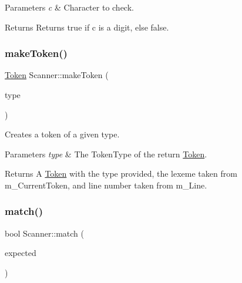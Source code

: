 \begin{DoxyParams}{Parameters}
{\em c} & Character to check. \\
\hline
\end{DoxyParams}
\begin{DoxyReturn}{Returns}
Returns true if c is a digit, else false. 
\end{DoxyReturn}
\mbox{\label{class_scanner_a67c546b078ac1e6780aa5ded2bfc4754}} 
\subsubsection{\texorpdfstring{make\+Token()}{makeToken()}}
{\footnotesize\ttfamily \hyperlink{struct_token}{Token} Scanner\+::make\+Token (\begin{DoxyParamCaption}\item[{\hyperlink{_scanner_8h_aa520fbf142ba1e7e659590c07da31921}{Token\+Type}}]{type }\end{DoxyParamCaption})\hspace{0.3cm}{\ttfamily [private]}}



Creates a token of a given type. 


\begin{DoxyParams}{Parameters}
{\em type} & The Token\+Type of the return \hyperlink{struct_token}{Token}. \\
\hline
\end{DoxyParams}
\begin{DoxyReturn}{Returns}
A \hyperlink{struct_token}{Token} with the type provided, the lexeme taken from m\+\_\+\+Current\+Token, and line number taken from m\+\_\+\+Line. 
\end{DoxyReturn}
\mbox{\label{class_scanner_a54cd78a16ceb924d3177f281cddd2fb6}} 
\subsubsection{\texorpdfstring{match()}{match()}}
{\footnotesize\ttfamily bool Scanner\+::match (\begin{DoxyParamCaption}\item[{char}]{expected }\end{DoxyParamCaption})\hspace{0.3cm}{\ttfamily [private]}}



